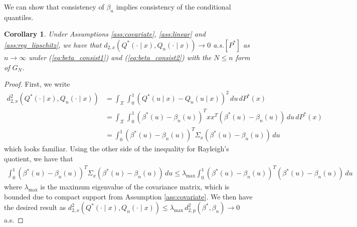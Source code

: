 \documentclass[11pt,a4paper]{article}
\newtheorem{cor}{Corollary}
\begin{document}
\begin{appendices}
We can show that consistency of $\beta_n$ implies consistency of the conditional quantiles.
\begin{cor}
 Under {Assumptions \ref{ass:covariate}}, {\ref{ass:linear}} and {\ref{ass:reg_lipschitz}}, we have that
             ${d}_{2,x}(Q^*(\cdot \mid x), Q_n(\cdot \mid x)) \to 0$ a.s.$[P^*]$
          as $n \to \infty$ under (\ref{eq:beta_consist1}) and (\ref{eq:beta_consist2}) with the $N\leq n$ form of $G_{N}$.
\end{cor}
\begin{proof}
First, we write
\begin{align*}
    {d}^2_{2,x}\left(Q^*(\cdot \mid x),Q_n(\cdot \mid x)\right) &= \int_{\mathcal{X}} \int_0^1 \left(Q^*(u \mid x) - Q_n(u \mid x)\right)^2 \, du\,  dP^*(x)\\
    &= \int_{\mathcal{X}} \int_0^1 \left(\beta^*(u) - \beta_n(u)\right)^T xx^T \left(\beta^*(u) - \beta_n(u)\right) \, du\,  dP^*(x)\\
    &= \int_0^1 \left(\beta^*(u) - \beta_n(u)\right)^T \Sigma_x \left(\beta^*(u) - \beta_n(u)\right) \, du
\end{align*}
which looks familiar. Using the other side of the inequality for Rayleigh's quotient, we have that
\begin{align*}
    \int_0^1 \left(\beta^*(u) - \beta_n(u)\right)^T \Sigma_x \left(\beta^*(u) - \beta_n(u)\right) \, du \leq  \lambda_{\text{max}}\int_0^1 \left(\beta^*(u) - \beta_n(u)\right)^T \left(\beta^*(u) - \beta_n(u)\right) \, du 
\end{align*}
where $\lambda_{\text{max}}$ is the maximum eigenvalue of the covariance matrix, which is bounded due to compact support from {Assumption \ref{ass:covariate}}. We then have the desired result as ${d}^2_{2,x}\left(Q^*(\cdot \mid x),Q_n(\cdot \mid x)\right) \leq \lambda_{\text{max}} \, d_{2,p}^2(\beta^*,\beta_n) \to 0$ a.s.
\end{proof}
    



\end{appendices}
\end{document}
